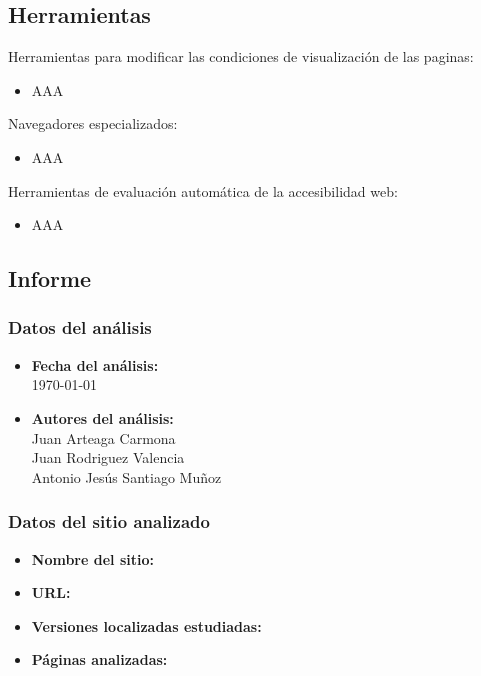 \documentclass[a4paper,11pt]{article}
\begin{document}
\subsection{Herramientas}
Herramientas para modificar las condiciones de visualización de las paginas:
\begin{itemize}
  \item AAA
\end{itemize}

Navegadores especializados:
\begin{itemize}
  \item AAA
\end{itemize}

Herramientas de evaluación automática de la accesibilidad web:
\begin{itemize}
  \item AAA
\end{itemize}

\subsection{Informe}
\subsubsection{Datos del análisis}
\begin{itemize}
  \item \textbf{Fecha del análisis:}\\
  \today
  \item \textbf{Autores del análisis:}\\
      Juan Arteaga Carmona\\
      Juan Rodriguez Valencia\\
      Antonio Jesús Santiago Muñoz
\end{itemize}

\subsubsection{Datos del sitio analizado}
\begin{itemize}
\item \textbf{Nombre del sitio:}\\
\item \textbf{URL:}\\
\item \textbf{Versiones localizadas estudiadas:}\\
\item \textbf{Páginas analizadas:}\\
\end{itemize}
\end{document}
